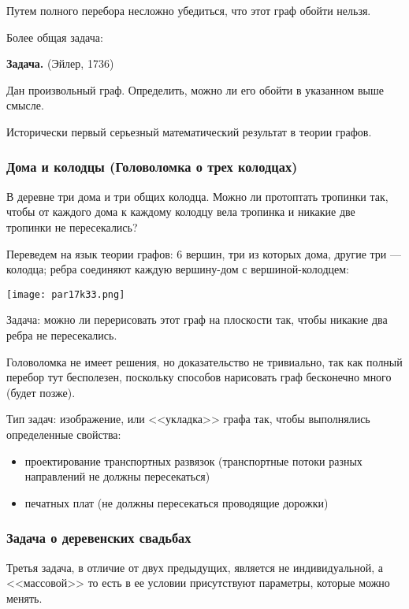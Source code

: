 Путем полного перебора несложно убедиться, что этот граф обойти нельзя.

Более общая задача:

\textbf{Задача.} (Эйлер, 1736)

Дан произвольный граф. Определить, можно ли его обойти в указанном выше смысле.

Исторически первый серьезный математический результат в теории графов.

\subsubsection*{Дома и колодцы (Головоломка о трех колодцах)}

В деревне три дома и три общих колодца. Можно ли протоптать тропинки так, чтобы от каждого дома к каждому колодцу вела тропинка и никакие две тропинки не пересекались?

Переведем на язык теории графов: 6 вершин, три из которых дома, другие три --- колодца; ребра соединяют каждую вершину-дом с вершиной-колодцем:

\begin{center}
    \texttt{[image: par17k33.png]}
\end{center}

Задача: можно ли перерисовать этот граф на плоскости так, чтобы никакие два ребра не пересекались.

Головоломка не имеет решения, но доказательство не тривиально, так как полный перебор тут бесполезен, поскольку способов нарисовать граф бесконечно много (будет позже).

Тип задач: изображение, или <<укладка>> графа так, чтобы выполнялись определенные свойства:

\begin{itemize}
    \item проектирование транспортных развязок (транспортные потоки разных направлений не должны пересекаться)
    \item печатных плат (не должны пересекаться проводящие дорожки)
\end{itemize}

\subsubsection*{Задача о деревенских свадьбах}

Третья задача, в отличие от двух предыдущих, является не индивидуальной, а <<массовой>> то есть в ее условии присутствуют параметры, которые можно менять.

